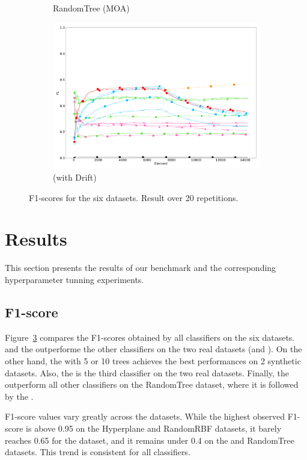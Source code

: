 \begin{figure}
\begin{subfigure}[t]{.49\linewidth}
		\caption{RandomTree (MOA)}
		\label{fig:f1-dataset_3}
	\end{subfigure}
	\hfill
	\begin{subfigure}[t]{.49\linewidth}
		\includegraphics[width=\linewidth]{figures/results/drift_3_f1.png}
		\caption{\banosdataset (with Drift)}
		\label{fig:f1-drift}
	\end{subfigure}
	\caption{F1-scores for the six datasets. Result over 20 repetitions.}
	\label{fig:f1}
\end{figure}

\section{Results}
This section presents the results of our benchmark and the corresponding
hyperparameter tunning experiments.

\subsection{F1-score}
Figure~\ref{fig:f1} compares the F1-scores obtained by all classifiers on the
six datasets.  \naivebayes and the \hoeffdingtree outperforme the other
classifiers on the two real datasets (\banosdataset and \recofitdataset).  On
the other hand, the \mondrianforest with 5 or 10 trees achieves the best
performances on 2 synthetic datasets.  Also, the \mondrianforest is the third
classifier on the two real datasets.  Finally, the \hoeffdingtree outperform
all other classifiers on the RandomTree dataset, where it is followed by the
\mondrianforest.

F1-score values vary greatly across the datasets.  While the highest
observed F1-score is above 0.95 on the Hyperplane and RandomRBF datasets,
it barely reaches 0.65 for the \banosdataset dataset, and it remains under
0.4 on the \recofitdataset and RandomTree datasets. This trend is
consistent for all classifiers.

